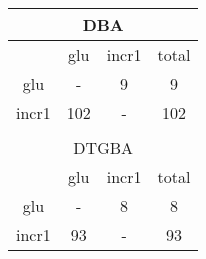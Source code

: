 \begin{tabular}{|c|c|c|c|}
\hline
\multicolumn{4}{|c|}{DBA}\\
\hline
&glu&incr1&total\\
\hline
glu&{-}&9&9\\
\hline
incr1&102&{-}&102\\
\hline
\multicolumn{4}{c}{}\\
\hline
\multicolumn{4}{|c|}{DTGBA}\\
\hline
&glu&incr1&total\\
\hline
glu&{-}&8&8\\
\hline
incr1&93&{-}&93\\
\hline
\end{tabular}